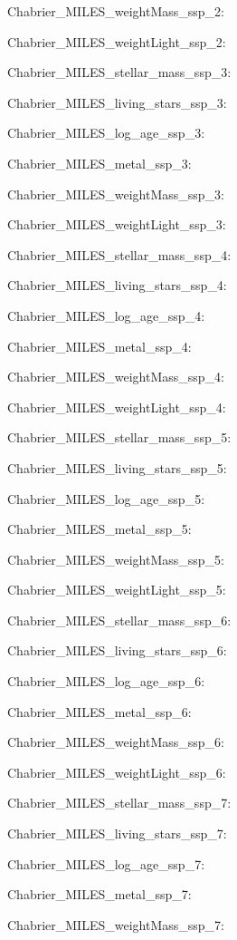 \item Chabrier\_MILES\_weightMass\_ssp\_2: 
\item Chabrier\_MILES\_weightLight\_ssp\_2: 
\item Chabrier\_MILES\_stellar\_mass\_ssp\_3: 
\item Chabrier\_MILES\_living\_stars\_ssp\_3: 
\item Chabrier\_MILES\_log\_age\_ssp\_3: 
\item Chabrier\_MILES\_metal\_ssp\_3: 
\item Chabrier\_MILES\_weightMass\_ssp\_3: 
\item Chabrier\_MILES\_weightLight\_ssp\_3: 
\item Chabrier\_MILES\_stellar\_mass\_ssp\_4: 
\item Chabrier\_MILES\_living\_stars\_ssp\_4: 
\item Chabrier\_MILES\_log\_age\_ssp\_4: 
\item Chabrier\_MILES\_metal\_ssp\_4: 
\item Chabrier\_MILES\_weightMass\_ssp\_4: 
\item Chabrier\_MILES\_weightLight\_ssp\_4: 
\item Chabrier\_MILES\_stellar\_mass\_ssp\_5: 
\item Chabrier\_MILES\_living\_stars\_ssp\_5: 
\item Chabrier\_MILES\_log\_age\_ssp\_5: 
\item Chabrier\_MILES\_metal\_ssp\_5: 
\item Chabrier\_MILES\_weightMass\_ssp\_5: 
\item Chabrier\_MILES\_weightLight\_ssp\_5: 
\item Chabrier\_MILES\_stellar\_mass\_ssp\_6: 
\item Chabrier\_MILES\_living\_stars\_ssp\_6: 
\item Chabrier\_MILES\_log\_age\_ssp\_6: 
\item Chabrier\_MILES\_metal\_ssp\_6: 
\item Chabrier\_MILES\_weightMass\_ssp\_6: 
\item Chabrier\_MILES\_weightLight\_ssp\_6: 
\item Chabrier\_MILES\_stellar\_mass\_ssp\_7: 
\item Chabrier\_MILES\_living\_stars\_ssp\_7: 
\item Chabrier\_MILES\_log\_age\_ssp\_7: 
\item Chabrier\_MILES\_metal\_ssp\_7: 
\item Chabrier\_MILES\_weightMass\_ssp\_7: 
